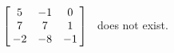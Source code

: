 {$\left[\hskip -3pt \begin{array}{ccc} 5&-1&0\\  7&7&1
\\  -2&-8&-1\end{array}\hskip -3pt \right]$ 
}
{\ttai\ does not exist.}
